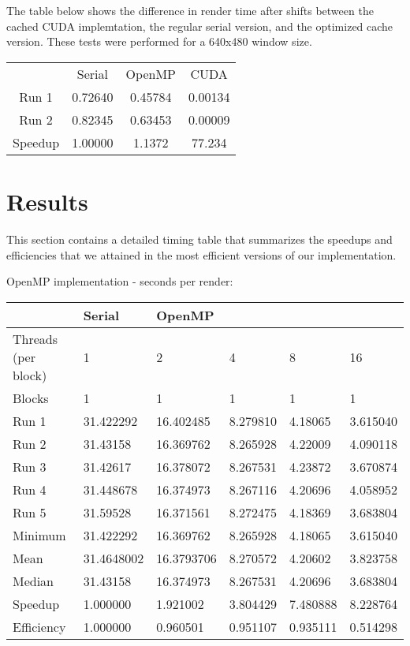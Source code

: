 \documentclass{article}
\begin{document}
The table below shows the difference in render time after shifts between the cached CUDA implemtation, the regular serial version, and the optimized cache version. These tests were performed for a 640x480 window size.\\

\begin{tabular}{ c c c c}
       & Serial & OpenMP & CUDA \\ 
 Run 1 & 0.72640 & 0.45784 & 0.00134 \\ 
 Run 2 & 0.82345 & 0.63453 & 0.00009\\ 
 Speedup & 1.00000 & 1.1372 & 77.234\\
\end{tabular}
\pagebreak
\section{Results}

This section contains a detailed timing table that summarizes the speedups and 
efficiencies that we attained in the most efficient versions of our 
implementation. 

OpenMP implementation - seconds per render: \\

\begin{tabular}{l   |   l    |    llll}
                    & Serial     & \multicolumn{4}{l}{OpenMP}                  \\
                    \hline
Threads (per block) & 1          & 2          & 4        & 8        & 16       \\
Blocks              & 1          & 1          & 1        & 1        & 1        \\
\hline
Run 1               & 31.422292  & 16.402485  & 8.279810 & 4.18065  & 3.615040 \\
Run 2               & 31.43158   & 16.369762  & 8.265928 & 4.22009  & 4.090118 \\
Run 3               & 31.42617   & 16.378072  & 8.267531 & 4.23872  & 3.670874 \\
Run 4               & 31.448678  & 16.374973  & 8.267116 & 4.20696  & 4.058952 \\
Run 5               & 31.59528   & 16.371561  & 8.272475 & 4.18369  & 3.683804 \\
\hline
Minimum             & 31.422292  & 16.369762  & 8.265928 & 4.18065  & 3.615040 \\
Mean                & 31.4648002 & 16.3793706 & 8.270572 & 4.20602  & 3.823758 \\
Median              & 31.43158   & 16.374973  & 8.267531 & 4.20696  & 3.683804 \\
Speedup             & 1.000000   & 1.921002   & 3.804429 & 7.480888 & 8.228764 \\
Efficiency          & 1.000000   & 0.960501   & 0.951107 & 0.935111 & 0.514298
\end{tabular}
\end{document}

